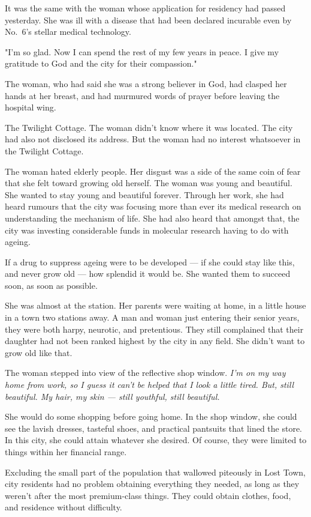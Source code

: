 It was the same with the woman whose application for residency had
passed yesterday. She was ill with a disease that had been declared
incurable even by No.~6's stellar medical technology.

"I'm so glad. Now I can spend the rest of my few years in peace. I give
my gratitude to God and the city for their compassion."

The woman, who had said she was a strong believer in God, had clasped
her hands at her breast, and had murmured words of prayer before leaving
the hospital wing.

The Twilight Cottage. The woman didn't know where it was located. The
city had also not disclosed its address. But the woman had no interest
whatsoever in the Twilight Cottage.

The woman hated elderly people. Her disgust was a side of the same coin
of fear that she felt toward growing old herself. The woman was young
and beautiful. She wanted to stay young and beautiful forever. Through
her work, she had heard rumours that the city was focusing more than
ever its medical research on understanding the mechanism of life. She
had also heard that amongst that, the city was investing considerable
funds in molecular research having to do with ageing.

If a drug to suppress ageing were to be developed --- if she could stay
like this, and never grow old --- how splendid it would be. She wanted
them to succeed soon, as soon as possible.

She was almost at the station. Her parents were waiting at home, in a
little house in a town two stations away. A man and woman just entering
their senior years, they were both harpy, neurotic, and pretentious.
They still complained that their daughter had not been ranked highest by
the city in any field. She didn't want to grow old like that.

The woman stepped into view of the reflective shop window. \emph{I'm on my way
home from work, so I guess it can't be helped that I look a little
tired. But, still beautiful. My hair, my skin --- still youthful, still
beautiful.}

She would do some shopping before going home. In the shop window, she
could see the lavish dresses, tasteful shoes, and practical pantsuits
that lined the store. In this city, she could attain whatever she
desired. Of course, they were limited to things within her financial
range.

Excluding the small part of the population that wallowed piteously in
Lost Town, city residents had no problem obtaining everything they
needed, as long as they weren't after the most premium-class things.
They could obtain clothes, food, and residence without difficulty.

